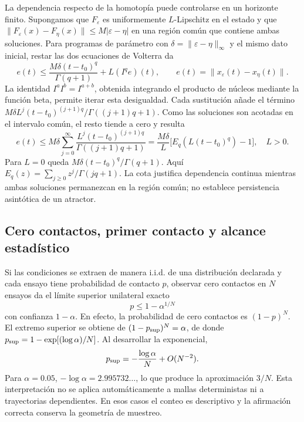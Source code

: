 La dependencia respecto de la homotopía puede controlarse en un horizonte
finito. Supongamos que \(F_\varepsilon\) es uniformemente
\(L\)-Lipschitz en el estado y que
\(\|F_\varepsilon(x)-F_\eta(x)\|\le M|\varepsilon-\eta|\) en una
región común que contiene ambas soluciones. Para programas de parámetro con
\(\delta=\|\varepsilon-\eta\|_\infty\) y el mismo dato inicial,
restar las dos ecuaciones de Volterra da
\[
 e(t)\le\frac{M\delta(t-t_0)^q}{\Gamma(q+1)}+L(I^qe)(t),
 \qquad e(t)=\|x_\varepsilon(t)-x_\eta(t)\|.
\]
La identidad \(I^aI^b=I^{a+b}\), obtenida integrando el producto de núcleos
mediante la función beta, permite iterar esta desigualdad. Cada sustitución
añade el término
\(M\delta L^j(t-t_0)^{(j+1)q}/\Gamma((j+1)q+1)\). Como las soluciones
son acotadas en el intervalo común, el resto tiende a cero y resulta
\begin{equation}
 e(t)\le M\delta\sum_{j=0}^\infty
 \frac{L^j(t-t_0)^{(j+1)q}}{\Gamma((j+1)q+1)}
 =\frac{M\delta}{L}\bigl[E_q(L(t-t_0)^q)-1\bigr],\quad L>0.
 \label{eq:homotopia-dependencia-parametro-volterra}
\end{equation}
Para \(L=0\) queda \(M\delta(t-t_0)^q/\Gamma(q+1)\).
Aquí \(E_q(z)=\sum_{j\ge0}z^j/\Gamma(jq+1)\). La cota justifica
dependencia continua mientras ambas soluciones permanezcan en la región
común; no establece persistencia asintótica de un atractor.

\ifHAFOBasinMaterial
\subsection{Cero contactos, primer contacto y alcance estadístico}
\label{sec:zero-contact}

Si las condiciones se extraen de manera i.i.d. de una distribución declarada
y cada ensayo tiene probabilidad de contacto \(p\), observar cero contactos en
\(N\) ensayos da el límite superior unilateral exacto
\begin{equation}
 p\leq1-\alpha^{1/N}
 \label{eq:th-binomial-upper}
\end{equation}
con confianza \(1-\alpha\). En efecto, la probabilidad de cero contactos
es \((1-p)^N\). El extremo superior se obtiene de
\((1-p_{\rm sup})^N=\alpha\), de donde
\(p_{\rm sup}=1-\exp[(\log\alpha)/N]\). Al desarrollar la exponencial,
\[
 p_{\rm sup}=-\frac{\log\alpha}{N}+O(N^{-2}).
\]
Para \(\alpha=0.05\), \(-\log\alpha=2.995732\ldots\), lo que produce
la aproximación \(3/N\). Esta interpretación no se aplica
automáticamente a mallas deterministas ni a trayectorias dependientes. En esos
casos el conteo es descriptivo y la afirmación correcta conserva la geometría
de muestreo.

